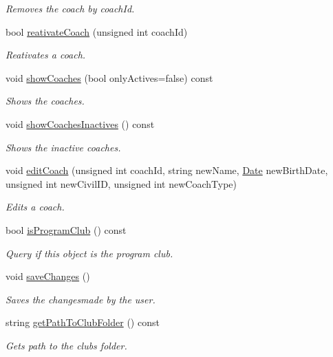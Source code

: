 \begin{DoxyCompactItemize}
\begin{DoxyCompactList}\small\item\em Removes the coach by coach\+Id. \end{DoxyCompactList}\item 
bool \hyperlink{class_club_a91ea60cae983d86c47e492aa77e59147}{reativate\+Coach} (unsigned int coach\+Id)
\begin{DoxyCompactList}\small\item\em Reativates a coach. \end{DoxyCompactList}\item 
void \hyperlink{class_club_a4a22977499beaf71a8bb369ac3c91ba1}{show\+Coaches} (bool only\+Actives=false) const
\begin{DoxyCompactList}\small\item\em Shows the coaches. \end{DoxyCompactList}\item 
void \hyperlink{class_club_a38615db317f0be62839fd65b3a827840}{show\+Coaches\+Inactives} () const
\begin{DoxyCompactList}\small\item\em Shows the inactive coaches. \end{DoxyCompactList}\item 
void \hyperlink{class_club_a8c659903f10d653b6ce946c0e9526209}{edit\+Coach} (unsigned int coach\+Id, string new\+Name, \hyperlink{class_date}{Date} new\+Birth\+Date, unsigned int new\+Civil\+ID, unsigned int new\+Coach\+Type)
\begin{DoxyCompactList}\small\item\em Edits a coach. \end{DoxyCompactList}\item 
bool \hyperlink{class_club_a4c867a8b3743c99fa57131709be0172a}{is\+Program\+Club} () const
\begin{DoxyCompactList}\small\item\em Query if this object is the program club. \end{DoxyCompactList}\item 
void \hyperlink{class_club_ad6b354484c2c621378e130388384df21}{save\+Changes} ()
\begin{DoxyCompactList}\small\item\em Saves the changesmade by the user. \end{DoxyCompactList}\item 
string \hyperlink{class_club_ae3d6a0ff813da8740a801d3051105203}{get\+Path\+To\+Club\+Folder} () const
\begin{DoxyCompactList}\small\item\em Gets path to the club\textquotesingle{}s folder. \end{DoxyCompactList}\item 

\end{DoxyCompactItemize}
